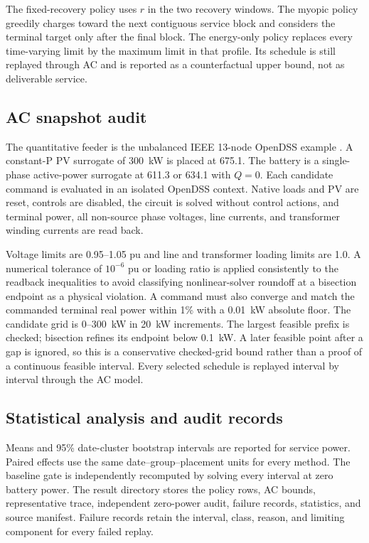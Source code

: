 \documentclass[11pt]{article}
\newcommand{\kw}[1]{#1~kW}
\begin{document}
The fixed-recovery policy uses $r$ in the two recovery windows. The myopic policy greedily charges toward the next contiguous service block and considers the terminal target only after the final block. The energy-only policy replaces every time-varying limit by the maximum limit in that profile. Its schedule is still replayed through AC and is reported as a counterfactual upper bound, not as deliverable service.

\subsection{AC snapshot audit}
The quantitative feeder is the unbalanced IEEE 13-node OpenDSS example \cite{OpenDSS13}. A constant-P PV surrogate of \kw{300} is placed at 675.1. The battery is a single-phase active-power surrogate at 611.3 or 634.1 with $Q=0$. Each candidate command is evaluated in an isolated OpenDSS context. Native loads and PV are reset, controls are disabled, the circuit is solved without control actions, and terminal power, all non-source phase voltages, line currents, and transformer winding currents are read back.

Voltage limits are 0.95--1.05 pu and line and transformer loading limits are 1.0. A numerical tolerance of $10^{-6}$ pu or loading ratio is applied consistently to the readback inequalities to avoid classifying nonlinear-solver roundoff at a bisection endpoint as a physical violation. A command must also converge and match the commanded terminal real power within 1\% with a 0.01~kW absolute floor. The candidate grid is 0--\kw{300} in \kw{20} increments. The largest feasible prefix is checked; bisection refines its endpoint below \kw{0.1}. A later feasible point after a gap is ignored, so this is a conservative checked-grid bound rather than a proof of a continuous feasible interval. Every selected schedule is replayed interval by interval through the AC model.

\subsection{Statistical analysis and audit records}
Means and 95\% date-cluster bootstrap intervals are reported for service power. Paired effects use the same date--group--placement units for every method. The baseline gate is independently recomputed by solving every interval at zero battery power. The result directory stores the policy rows, AC bounds, representative trace, independent zero-power audit, failure records, statistics, and source manifest. Failure records retain the interval, class, reason, and limiting component for every failed replay.
\end{document}
